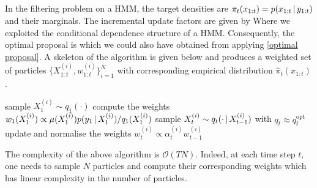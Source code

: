 \subsection{}
In the filtering problem on a HMM, the target densities are $\pi_{t}(x_{1:t})=p(x_{1:t}\,|\, y_{1:t})$ and their marginals. The incremental update factors are given by
Where we exploited the conditional dependence structure of a HMM. Consequently, the optimal proposal is
which we could also have obtained from applying \eqref{optimal proposal}. A skeleton of the algorithm is given below and produces a weighted set of particles $\{X^{(i)}_{1:t},w^{(i)}_{1:t}\}_{i=1}^{N}$ with corresponding empirical distribution $\hat \pi_{t}(x_{1:t})$. 
%
%
\begin{algorithm}[!h]\small
	\caption{}
	\begin{algorithmic}[1]
		\State sample $X_{1}^{(i)}\sim q_{1}(\cdot)$ %
		\State compute the weights $w_{1}(X^{(i)}_{1})\propto {\mu( X^{(i)}_{1})p(y_{1}\,|\,X^{(i)}_{1})/ q_{1}(X^{(i)}_{1})}$
			\State sample $X^{(i)}_{t}\sim q_{t}( \cdot \,|\, X^{(i)}_{t-1})$ with $q_{t}\approx q_{t}^{\text{opt}}$
			\State update and normalise the weights $w^{(i)}_{t}\propto\alpha^{(i)}_{t}w^{(i)}_{t-1}$
		\EndFor
	\end{algorithmic}
\end{algorithm}

\noi\hspace{0pt}The complexity of the above algorithm is $\mathcal O(TN)$. Indeed, at each time step $t$, one needs to sample $N$ particles and compute their corresponding weights which has linear complexity in the number of particles.\\

